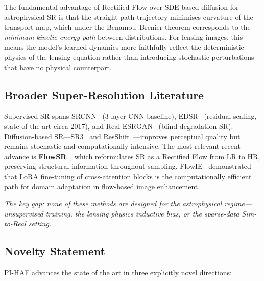\documentclass[11pt,a4paper]{article}
\begin{document}
The fundamental advantage of Rectified Flow over SDE-based diffusion for astrophysical SR is that the straight-path trajectory minimises curvature of the transport map, which under the Benamou--Brenier theorem corresponds to the \emph{minimum kinetic energy path} between distributions. For lensing images, this means the model's learned dynamics more faithfully reflect the deterministic physics of the lensing equation rather than introducing stochastic perturbations that have no physical counterpart.

\subsection{Broader Super-Resolution Literature}

Supervised SR spans SRCNN~\citep{dong2015} (3-layer CNN baseline), EDSR~\citep{lim2017} (residual scaling, state-of-the-art circa 2017), and Real-ESRGAN~\citep{wang2021} (blind degradation SR). Diffusion-based SR---SR3~\citep{saharia2022} and ResShift~\citep{yue2023}---improves perceptual quality but remains stochastic and computationally intensive. The most relevant recent advance is \textbf{FlowSR}~\citep{xu2025}, which reformulates SR as a Rectified Flow from LR to HR, preserving structural information throughout sampling. FlowIE~\citep{zhu2024} demonstrated that LoRA fine-tuning of cross-attention blocks is the computationally efficient path for domain adaptation in flow-based image enhancement.

\textit{The key gap: none of these methods are designed for the astrophysical regime---unsupervised training, the lensing physics inductive bias, or the sparse-data Sim-to-Real setting.}

\subsection{Novelty Statement}

PI-HAF advances the state of the art in three explicitly novel directions:
\end{document}
